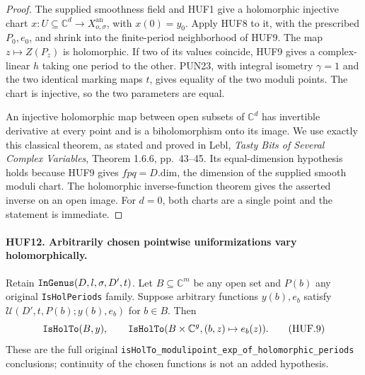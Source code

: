 \documentclass[11pt,a4paper]{article}
\numberwithin{equation}{section}
\theoremstyle{remark}\newtheorem{remark}[theorem]{Remark}
\begin{document}
\begin{proof}
The supplied smoothness field and HUF1 give a
holomorphic injective chart \(x:U\subseteq\mathbb C^d
\to X_{o,\sigma}^{\mathrm{an}}\), with \(x(0)=y_0\).
Apply HUF8 to it, with the prescribed \(P_0,e_0\),
and shrink into the finite-period neighborhood of
HUF9.  The map \(z\mapsto Z(P_z)\) is holomorphic.
If two of its values coincide, HUF9 gives a
complex-linear \(h\) taking one period to the other.
PUN23, with integral isometry \(\gamma=1\) and
the two identical marking maps \(t\), gives equality
of the two moduli points.  The chart is injective,
so the two parameters are equal.

An injective holomorphic map between open subsets
of \(\mathbb C^d\) has invertible derivative at
every point and is a biholomorphism onto its image.
We use exactly this classical theorem, as stated
and proved in Lebl, \emph{Tasty Bits of Several
Complex Variables}, Theorem 1.6.6, pp.\ 43--45.
Its equal-dimension hypothesis holds because
HUF9 gives \(fpq=D.\mathrm{dim}\), the dimension
of the supplied smooth moduli chart.
The holomorphic inverse-function theorem gives
the asserted inverse on an open image.
For \(d=0\), both charts are a single point
and the statement is immediate.
\end{proof}

\paragraph{HUF12. Arbitrarily chosen pointwise uniformizations vary holomorphically.}
\label{claim:HUF12}
Retain \(\texttt{In\allowbreak Genus}(D,l,\sigma,D',t)\).
Let \(B\subseteq\mathbb C^m\) be any open set and
\(P(b)\) any original \texttt{Is\allowbreak Hol\allowbreak Periods} family.
Suppose arbitrary functions \(y(b),e_b\) satisfy
\(\mathcal U(D',t,P(b);y(b),e_b)\) for \(b\in B\).
Then
\[
 \texttt{Is\allowbreak Hol\allowbreak To}(B,y),\qquad
 \texttt{Is\allowbreak Hol\allowbreak To}(B\times\mathbb C^g,(b,z)\mapsto e_b(z)).
 \tag{HUF.9}
\]
These are the full original
\texttt{is\allowbreak Hol\allowbreak To\_\allowbreak modulipoint\_\allowbreak exp\_\allowbreak of\_\allowbreak holomorphic\_\allowbreak periods}
conclusions; continuity of the chosen functions is not
an added hypothesis.
\end{document}
